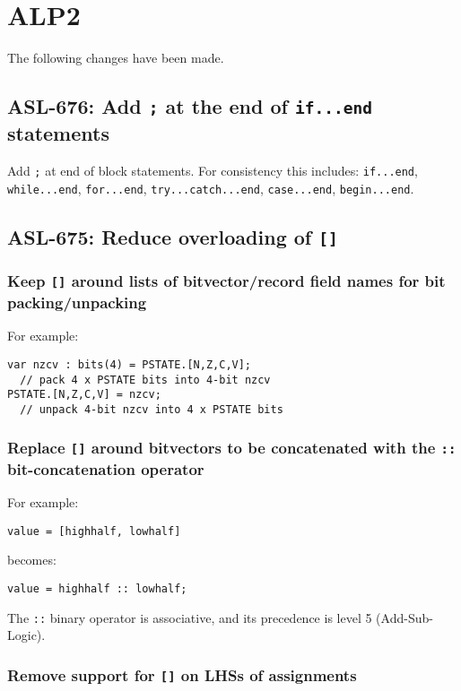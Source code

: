 \section{ALP2}

The following changes have been made.

\subsection{ASL-676: Add \texttt{;} at the end of \texttt{if...end} statements}

Add \texttt{;} at end of block statements.
For consistency this includes: \texttt{if...end}, \texttt{while...end},
\texttt{for...end}, \texttt{try...catch...end}, \texttt{case...end},
\texttt{begin...end}.

\subsection{ASL-675: Reduce overloading of \texttt{[]}}

\subsubsection{Keep \texttt{[]} around lists of bitvector/record field
names for bit packing/unpacking}

For example:
\begin{verbatim}
var nzcv : bits(4) = PSTATE.[N,Z,C,V];
  // pack 4 x PSTATE bits into 4-bit nzcv
PSTATE.[N,Z,C,V] = nzcv;
  // unpack 4-bit nzcv into 4 x PSTATE bits
\end{verbatim}

\subsubsection{Replace \texttt{[]} around bitvectors to be concatenated
with the \texttt{::} bit-concatenation operator}

For example:
\begin{verbatim}
value = [highhalf, lowhalf]
\end{verbatim}
becomes:
\begin{verbatim}
value = highhalf :: lowhalf;
\end{verbatim}
The \texttt{::} binary operator is associative, and its precedence is
level 5 (Add-Sub-Logic).

\subsubsection{Remove support for \texttt{[]} on LHSs of assignments}

